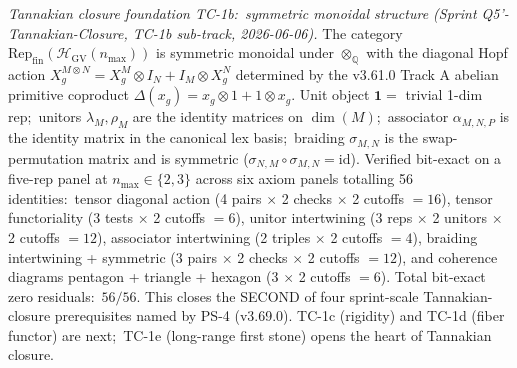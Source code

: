 \documentclass[11pt,a4paper]{article}
\theoremstyle{plain}
\theoremstyle{definition}
\begin{document}
\emph{Tannakian closure foundation TC-1b:\ symmetric monoidal
structure (Sprint Q5'-Tannakian-Closure, TC-1b sub-track, 2026-06-06).}  The category
$\mathrm{Rep}_{\mathrm{fin}}(\mathcal{H}_{\mathrm{GV}}(n_{\max}))$
is symmetric monoidal under $\otimes_\mathbb{Q}$ with the diagonal
Hopf action
$X_g^{M \otimes N} = X_g^M \otimes I_N + I_M \otimes X_g^N$
determined by the v3.61.0 Track A abelian primitive coproduct
$\Delta(x_g) = x_g \otimes 1 + 1 \otimes x_g$.  Unit object
$\mathbf{1} = $ trivial 1-dim rep;\ unitors $\lambda_M, \rho_M$ are
the identity matrices on $\dim(M)$;\ associator $\alpha_{M, N, P}$
is the identity matrix in the canonical lex basis;\ braiding
$\sigma_{M, N}$ is the swap-permutation matrix and is symmetric
($\sigma_{N, M} \circ \sigma_{M, N} = \mathrm{id}$).  Verified
bit-exact on a five-rep panel at $n_{\max} \in \{2, 3\}$ across six
axiom panels totalling 56 identities:\ tensor diagonal action
(4 pairs $\times$ 2 checks $\times$ 2 cutoffs $= 16$), tensor
functoriality (3 tests $\times$ 2 cutoffs $= 6$), unitor intertwining
(3 reps $\times$ 2 unitors $\times$ 2 cutoffs $= 12$), associator
intertwining (2 triples $\times$ 2 cutoffs $= 4$), braiding
intertwining + symmetric (3 pairs $\times$ 2 checks $\times$
2 cutoffs $= 12$), and coherence diagrams pentagon + triangle +
hexagon (3 $\times$ 2 cutoffs $= 6$).  Total bit-exact zero
residuals:\ $56 / 56$.  This closes the SECOND of four sprint-scale
Tannakian-closure prerequisites named by PS-4 (v3.69.0).  TC-1c
(rigidity) and TC-1d (fiber functor) are next;\ TC-1e (long-range
first stone) opens the heart of Tannakian closure.
\end{document}
